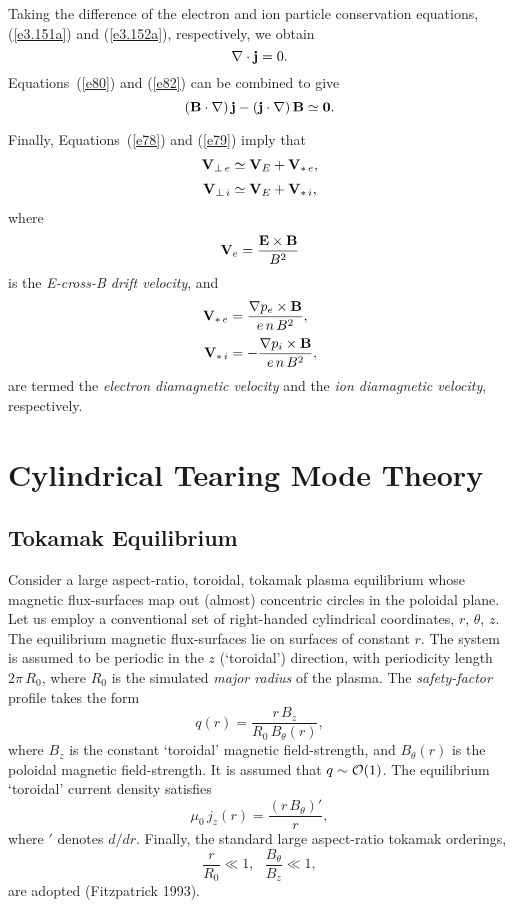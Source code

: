 \documentclass[notitlepage,12pt]{article}
\begin{document}
 Taking the difference of the electron and ion particle
conservation equations, (\ref{e3.151a}) and (\ref{e3.152a}), respectively, we obtain
\begin{equation}\label{e82}
\nabla\cdot {\bf j} = 0.
\end{equation}
 Equations~(\ref{e80}) and (\ref{e82}) can be combined to give
\begin{equation}\label{e84}
({\bf B}\cdot\nabla)\,{\bf j } - ({\bf j}\cdot\nabla)\,{\bf B} \simeq {\bf 0}.
\end{equation}

Finally, Equations~(\ref{e78}) and (\ref{e79}) imply that
\begin{align}
{\bf V}_{\perp\,e} &\simeq {\bf V}_E + {\bf V}_{\ast\,e},\\[0.5ex]
{\bf V}_{\perp\,i} &\simeq {\bf V}_E + {\bf V}_{\ast\,i},
\end{align}
where
\begin{equation}
{\bf V}_e = \frac{{\bf E}\times {\bf B}}{B^2}
\end{equation}
is the {\em E-cross-B drift velocity}, and
\begin{align}
{\bf V}_{\ast\,e}&= \frac{\nabla p_e\times {\bf B}}{e\,n\,B^2},\\[0.5ex]
{\bf V}_{\ast\,i}&=- \frac{\nabla p_i\times {\bf B}}{e\,n\,B^2},
\end{align}
are termed the {\em electron diamagnetic velocity}\/ and the {\em ion diamagnetic velocity}, respectively. 

\section{Cylindrical Tearing Mode Theory}
\subsection{Tokamak Equilibrium}
Consider a large aspect-ratio, toroidal,  tokamak plasma equilibrium whose magnetic flux-surfaces map out (almost) concentric circles in the poloidal plane. 
Let us employ a conventional set of right-handed cylindrical coordinates, $r$, $\theta$, $z$. The
equilibrium magnetic flux-surfaces lie on surfaces of constant $r$. The system is
assumed to be periodic in the $z$ (`toroidal') direction, with periodicity length $2\pi\,R_0$, 
where $R_0$ is the simulated {\em major radius}\/ of the plasma. The {\em safety-factor}\/ profile takes the form
\begin{equation}\label{e90}
q(r)= \frac{r\,B_z}{R_0\,B_\theta(r)},
\end{equation}
where $B_z$ is the constant `toroidal' magnetic field-strength, and $B_\theta(r)$ is
the poloidal magnetic field-strength. It is assumed that $q\sim{\cal O}(1)$. 
The equilibrium `toroidal' current density
satisfies
\begin{equation}
\mu_0\,j_z(r) = \frac{(r\,B_\theta)'}{r},
\end{equation}
where $'$ denotes $d/dr$. Finally, the standard large aspect-ratio
tokamak orderings,  
\begin{equation}\label{e92}
\frac{r}{R_0}\ll 1,~~~ \frac{B_\theta}{B_z}\ll 1,
\end{equation}
are adopted (Fitzpatrick 1993). 
\end{document}

